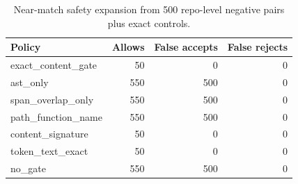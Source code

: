 \begin{table}[t]
\centering
\caption{Near-match safety expansion from 500 repo-level negative pairs plus exact controls.}
\label{tab:nearmatch-safety}
\begin{tabular}{lrrr}
\toprule
Policy & Allows & False accepts & False rejects \\
\midrule
exact\_content\_gate & 50 & 0 & 0 \\
ast\_only & 550 & 500 & 0 \\
span\_overlap\_only & 550 & 500 & 0 \\
path\_function\_name & 550 & 500 & 0 \\
content\_signature & 50 & 0 & 0 \\
token\_text\_exact & 50 & 0 & 0 \\
no\_gate & 550 & 500 & 0 \\
\bottomrule
\end{tabular}
\end{table}
